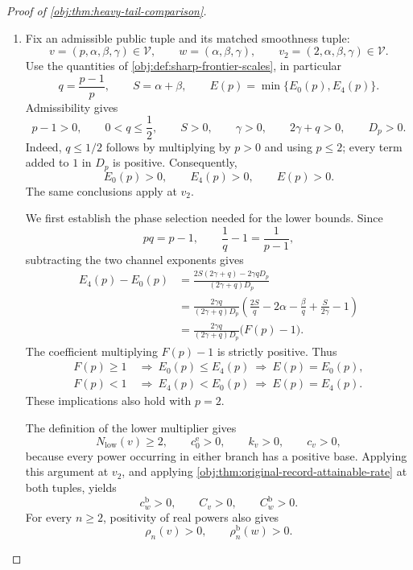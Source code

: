 \begin{proof}[Proof of \cref{obj:thm:heavy-tail-comparison}]
\begin{enumerate}
\item Fix an admissible public tuple and its matched smoothness tuple:
\[
v=(p,\alpha,\beta,\gamma)\in\mathcal V,
\qquad
w=(\alpha,\beta,\gamma),
\qquad
v_2=(2,\alpha,\beta,\gamma)\in\mathcal V.
\]
Use the quantities of \cref{obj:def:sharp-frontier-scales}, in particular
\[
q=\frac{p-1}{p},
\qquad
S=\alpha+\beta,
\qquad
E(p)=\min\{E_0(p),E_4(p)\}.
\]
Admissibility gives
\[
p-1>0,\qquad
0<q\le\frac12,\qquad
S>0,\qquad
\gamma>0,\qquad
2\gamma+q>0,\qquad
D_p>0.
\]
Indeed, \(q\le1/2\) follows by multiplying by \(p>0\) and using \(p\le2\); every term added to \(1\) in \(D_p\) is positive. Consequently,
\[
E_0(p)>0,\qquad E_4(p)>0,\qquad E(p)>0.
\]
The same conclusions apply at \(v_2\).

We first establish the phase selection needed for the lower bounds. Since
\[
pq=p-1,
\qquad
\frac1q-1=\frac1{p-1},
\]
subtracting the two channel exponents gives
\[
\begin{aligned}
E_4(p)-E_0(p)
&=\frac{2S(2\gamma+q)-2\gamma qD_p}
        {(2\gamma+q)D_p}\\
&=\frac{2\gamma q}{(2\gamma+q)D_p}
  \left(
  \frac{2S}{q}-2\alpha-\frac{\beta}{q}
  +\frac{S}{2\gamma}-1
  \right)\\
&=\frac{2\gamma q}{(2\gamma+q)D_p}\bigl(F(p)-1\bigr).
\end{aligned}
\]
The coefficient multiplying \(F(p)-1\) is strictly positive. Thus
\[
\begin{aligned}
F(p)\ge1&\ \Longrightarrow\ E_0(p)\le E_4(p)
                       \ \Longrightarrow\ E(p)=E_0(p),\\
F(p)<1&\ \Longrightarrow\ E_4(p)<E_0(p)
                       \ \Longrightarrow\ E(p)=E_4(p).
\end{aligned}
\]
These implications also hold with \(p=2\).

The definition of the lower multiplier gives
\[
N_{\mathrm{low}}(v)\ge2,
\qquad
c_0^{\mathrm e}>0,
\qquad
k_v>0,
\qquad
c_v>0,
\]
because every power occurring in either branch has a positive base. Applying this argument at \(v_2\), and applying \cref{obj:thm:original-record-attainable-rate} at both tuples, yields
\[
c_w^{\mathrm b}>0,\qquad C_v>0,\qquad C_w^{\mathrm b}>0.
\]
For every \(n\ge2\), positivity of real powers also gives
\[
\rho_n(v)>0,
\qquad
\rho_n^{\mathrm b}(w)>0.
\]


\end{enumerate}
\end{proof}
